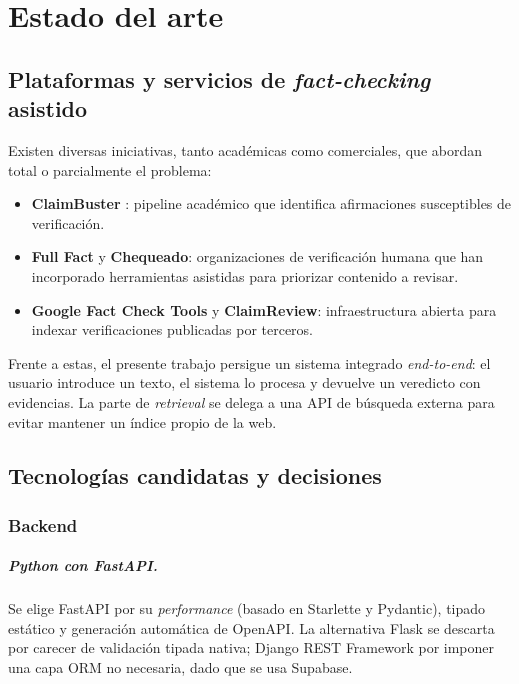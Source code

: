\chapter{Estado del arte}\label{cap:estado-arte}

\section{Plataformas y servicios de \emph{fact-checking} asistido}

Existen diversas iniciativas, tanto académicas como comerciales, que
abordan total o parcialmente el problema:

\begin{itemize}[leftmargin=*,itemsep=0.2em]
  \item \textbf{ClaimBuster} \cite{hassan2017claimbuster}: pipeline
        académico que identifica afirmaciones susceptibles de
        verificación.
  \item \textbf{Full Fact} y \textbf{Chequeado}: organizaciones de
        verificación humana que han incorporado herramientas asistidas
        para priorizar contenido a revisar.
  \item \textbf{Google Fact Check Tools} y \textbf{ClaimReview}:
        infraestructura abierta para indexar verificaciones publicadas
        por terceros.
\end{itemize}

Frente a estas, el presente trabajo persigue un sistema integrado
\emph{end-to-end}: el usuario introduce un texto, el sistema lo
procesa y devuelve un veredicto con evidencias. La parte de
\emph{retrieval} se delega a una API de búsqueda externa para evitar
mantener un índice propio de la web.

\section{Tecnologías candidatas y decisiones}

\subsection{Backend}

\paragraph{Python con FastAPI.} Se elige FastAPI por su
\emph{performance} (basado en Starlette y Pydantic), tipado estático
y generación automática de OpenAPI. La alternativa Flask se descarta
por carecer de validación tipada nativa; Django REST Framework por
imponer una capa ORM no necesaria, dado que se usa Supabase.

